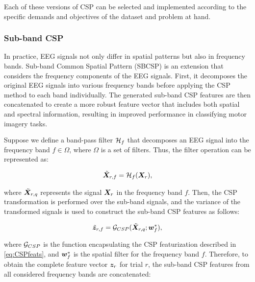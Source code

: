 
Each of these versions of CSP can be selected and implemented according to the specific demands and objectives of the dataset and problem at hand.

\subsubsection{Sub-band CSP}

In practice, EEG signals not only differ in spatial patterns but also in frequency bands. Sub-band Common Spatial Pattern (SBCSP) is an extension that considers the frequency components of the EEG signals. First, it decomposes the original EEG signals into various frequency bands before applying the CSP method to each band individually. The generated sub-band CSP features are then concatenated to create a more robust feature vector that includes both spatial and spectral information, resulting in improved performance in classifying motor imagery tasks.

Suppose we define a band-pass filter $\mathcal {H}_f$ that decomposes an EEG signal into the frequency band $f \in \Omega$, where $\Omega$ is a set of filters. Thus, the filter operation can be represented as:

\begin{equation}
\tilde{\bm {X}}_{r,f} = \mathcal {H}_f(\bm {X}_r)   , 
\end{equation}

where $\tilde{\bm {X}}_{r,q}$ represents the signal $\bm {X}_r$ in the frequency band $f$. Then, the CSP transformation is performed over the sub-band signals, and the variance of the transformed signals is used to construct the sub-band CSP features as follows:

\begin{equation}
\tilde{\bm {z}}_{r,f} = \mathcal {G}_{CSP}(\tilde{\bm {X}}_{r,q}; \bm {w}_{f}^{*})   , 
\end{equation}

where $\mathcal {G}_{CSP}$ is the function encapsulating the CSP featurization described in \eqref{eq:CSPfeats}, and $\bm {w}^{*}_{f}$ is the spatial filter for the frequency band $f$. Therefore, to obtain the complete feature vector $\bm {z}_r$ for trial $r$, the sub-band CSP features from all considered frequency bands are concatenated:

